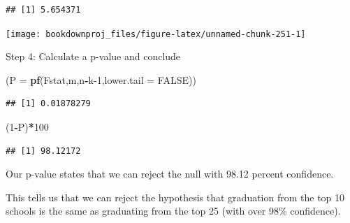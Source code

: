 \documentclass[
]{book}
\newenvironment{Shaded}{\begin{snugshade}}{\end{snugshade}}
\newcommand{\AttributeTok}[1]{\textcolor[rgb]{0.13,0.29,0.53}{#1}}
\newcommand{\ConstantTok}[1]{\textcolor[rgb]{0.56,0.35,0.01}{#1}}
\newcommand{\DecValTok}[1]{\textcolor[rgb]{0.00,0.00,0.81}{#1}}
\newcommand{\FunctionTok}[1]{\textcolor[rgb]{0.13,0.29,0.53}{\textbf{#1}}}
\newcommand{\NormalTok}[1]{#1}
\newcommand{\SpecialCharTok}[1]{\textcolor[rgb]{0.81,0.36,0.00}{\textbf{#1}}}
\begin{document}
\begin{verbatim}
## [1] 5.654371
\end{verbatim}

\begin{center}\texttt{[image: bookdownproj\_files/figure-latex/unnamed-chunk-251-1]} \end{center}

Step 4: Calculate a p-value and conclude

\begin{Shaded}
\begin{Highlighting}[]
\NormalTok{(}\AttributeTok{P =} \FunctionTok{pf}\NormalTok{(Fstat,m,n}\SpecialCharTok{{-}}\NormalTok{k}\DecValTok{{-}1}\NormalTok{,}\AttributeTok{lower.tail =} \ConstantTok{FALSE}\NormalTok{))}
\end{Highlighting}
\end{Shaded}

\begin{verbatim}
## [1] 0.01878279
\end{verbatim}

\begin{Shaded}
\begin{Highlighting}[]
\NormalTok{(}\DecValTok{1}\SpecialCharTok{{-}}\NormalTok{P)}\SpecialCharTok{*}\DecValTok{100}
\end{Highlighting}
\end{Shaded}

\begin{verbatim}
## [1] 98.12172
\end{verbatim}

Our p-value states that we can reject the null with 98.12 percent confidence.

This tells us that we can reject the hypothesis that graduation from the top 10 schools is the same as graduating from the top 25 (with over 98\% confidence).
\end{document}
